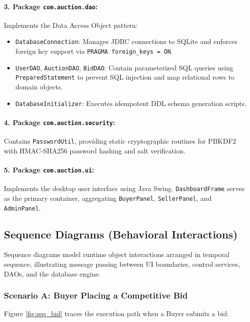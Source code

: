 \paragraph{3. Package \texttt{com.auction.dao}:}
Implements the Data Access Object pattern:
\begin{itemize}
    \item \texttt{DatabaseConnection}: Manages JDBC connections to SQLite and enforces foreign key support via \texttt{PRAGMA foreign\_keys = ON}.
    \item \texttt{UserDAO}, \texttt{AuctionDAO}, \texttt{BidDAO}: Contain parameterized SQL queries using \texttt{PreparedStatement} to prevent SQL injection and map relational rows to domain objects.
    \item \texttt{DatabaseInitializer}: Executes idempotent DDL schema generation scripts.
\end{itemize}

\paragraph{4. Package \texttt{com.auction.security}:}
Contains \texttt{PasswordUtil}, providing static cryptographic routines for PBKDF2 with HMAC-SHA256 password hashing and salt verification.

\paragraph{5. Package \texttt{com.auction.ui}:}
Implements the desktop user interface using Java Swing. \texttt{DashboardFrame} serves as the primary container, aggregating \texttt{BuyerPanel}, \texttt{SellerPanel}, and \texttt{AdminPanel}.

\subsection{Sequence Diagrams (Behavioral Interactions)}
\label{subsec:uml_sequence}

Sequence diagrams model runtime object interactions arranged in temporal sequence, illustrating message passing between UI boundaries, control services, DAOs, and the database engine.

\subsubsection{Scenario A: Buyer Placing a Competitive Bid}
Figure \ref{fig:seq_bid} traces the execution path when a Buyer submits a bid.

